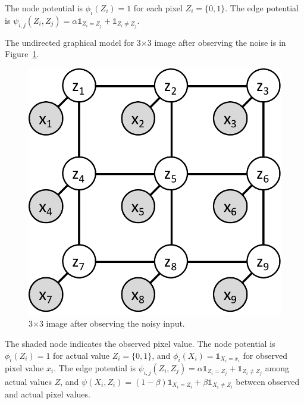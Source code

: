 \documentclass{article}
\begin{document}
The node potential is $\phi_i(Z_i)=1$ for each pixel $Z_i=\{0, 1\}$. The edge potential is $\psi_{i,j}(Z_i, Z_j)=\alpha \mathds{1}_{Z_i=Z_j} + \mathds{1}_{Z_i\neq Z_j}$.

The undirected graphical model for 3$\times$3 image after observing the noise is in Figure~\ref{f:c1bii}.
\begin{figure}[h]
  \centering
  \includegraphics[width=0.2\columnwidth]{c1bii.pdf}
    \vspace{-0.1cm}
  \caption{3$\times$3 image after observing the noisy input.}
  \label{f:c1bii}
\end{figure}

The shaded node indicates the observed pixel value. The node potential is $\phi_i(Z_i)=1$ for actual value $Z_i=\{0, 1\}$, and $\phi_i(X_i)=\mathds{1}_{X_i = x_i}$ for observed pixel value $x_i$. The edge potential is $\psi_{i,j}(Z_i, Z_j)=\alpha \mathds{1}_{Z_i=Z_j} + \mathds{1}_{Z_i\neq Z_j}$ among actual values $Z$, and $\psi(X_i, Z_i)=(1-\beta) \mathds{1}_{X_i=Z_i} + \beta\mathds{1}_{X_i\neq Z_i}$ between observed and actual pixel values. 
\\
\end{document}
